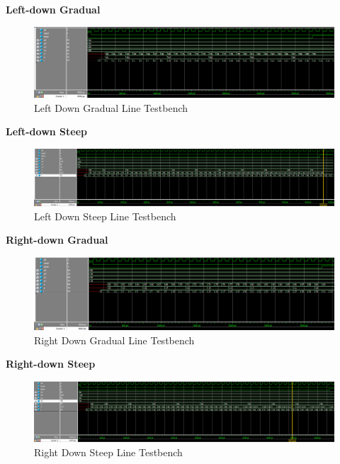 \documentclass[11pt, titlepage]{article}
\begin{document}
\begin{description}
                \newpage
                \item \textbf{Left-down Gradual} \\
                    \begin{figure}[H]
                        \centering
                        \includegraphics[scale = 0.6]{Images/left-down gradual line testbench.png}
                        \caption{Left Down Gradual Line Testbench}
                    \end{figure}
                \item \textbf{Left-down Steep} \\
                    \begin{figure}[H]
                        \centering
                        \includegraphics[scale = 0.5]{Images/left-down steep line testbench.png}
                        \caption{Left Down Steep Line Testbench}
                    \end{figure}
                \item \textbf{Right-down Gradual} \\
                    \begin{figure}[H]
                        \centering
                        \includegraphics[scale = 0.6]{Images/right-down gradual line testbench.png}
                        \caption{Right Down Gradual Line Testbench}
                    \end{figure}
                \newpage
                \item \textbf{Right-down Steep} \\
                    \begin{figure}[H]
                        \centering
                        \includegraphics[scale = 0.5]{Images/right-down steep line testbench.png}
                        \caption{Right Down Steep Line Testbench}
                    \end{figure}


\end{description}
\end{document}
